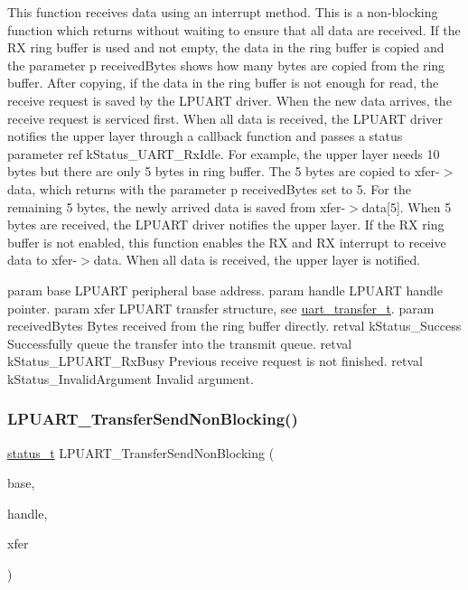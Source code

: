 This function receives data using an interrupt method. This is a non-\/blocking function which returns without waiting to ensure that all data are received. If the RX ring buffer is used and not empty, the data in the ring buffer is copied and the parameter p received\+Bytes shows how many bytes are copied from the ring buffer. After copying, if the data in the ring buffer is not enough for read, the receive request is saved by the L\+P\+U\+A\+RT driver. When the new data arrives, the receive request is serviced first. When all data is received, the L\+P\+U\+A\+RT driver notifies the upper layer through a callback function and passes a status parameter ref k\+Status\+\_\+\+U\+A\+R\+T\+\_\+\+Rx\+Idle. For example, the upper layer needs 10 bytes but there are only 5 bytes in ring buffer. The 5 bytes are copied to xfer-\/$>$data, which returns with the parameter p received\+Bytes set to 5. For the remaining 5 bytes, the newly arrived data is saved from xfer-\/$>$data\mbox{[}5\mbox{]}. When 5 bytes are received, the L\+P\+U\+A\+RT driver notifies the upper layer. If the RX ring buffer is not enabled, this function enables the RX and RX interrupt to receive data to xfer-\/$>$data. When all data is received, the upper layer is notified.

param base L\+P\+U\+A\+RT peripheral base address. param handle L\+P\+U\+A\+RT handle pointer. param xfer L\+P\+U\+A\+RT transfer structure, see \mbox{\hyperlink{group__uart__driver_gae245db88e02822f416e4d246d49076df}{uart\+\_\+transfer\+\_\+t}}. param received\+Bytes Bytes received from the ring buffer directly. retval k\+Status\+\_\+\+Success Successfully queue the transfer into the transmit queue. retval k\+Status\+\_\+\+L\+P\+U\+A\+R\+T\+\_\+\+Rx\+Busy Previous receive request is not finished. retval k\+Status\+\_\+\+Invalid\+Argument Invalid argument. \mbox{\label{group__lpuart__driver_gafba986c473e5935131e63cb882cf26ff}} 
\subsubsection{\texorpdfstring{LPUART\_TransferSendNonBlocking()}{LPUART\_TransferSendNonBlocking()}}
{\footnotesize\ttfamily \mbox{\hyperlink{group__ksdk__common_gaaabdaf7ee58ca7269bd4bf24efcde092}{status\+\_\+t}} L\+P\+U\+A\+R\+T\+\_\+\+Transfer\+Send\+Non\+Blocking (\begin{DoxyParamCaption}\item[{\mbox{\hyperlink{struct_l_p_u_a_r_t___type}{L\+P\+U\+A\+R\+T\+\_\+\+Type}} $\ast$}]{base,  }\item[{\mbox{\hyperlink{struct__lpuart__handle}{lpuart\+\_\+handle\+\_\+t}} $\ast$}]{handle,  }\item[{\mbox{\hyperlink{group__lpuart__driver_ga1d4707ebc5d49dd655eedb7e5acd27fd}{lpuart\+\_\+transfer\+\_\+t}} $\ast$}]{xfer }\end{DoxyParamCaption})}



